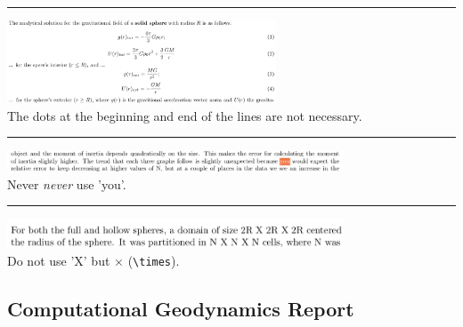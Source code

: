 \par\noindent\rule{\textwidth}{0.4pt}
\begin{center}
\includegraphics[width=8cm]{images/grading/dots}\\
The dots at the beginning and end of the lines are not necessary.
\end{center}

\par\noindent\rule{\textwidth}{0.4pt}
\begin{center}
\includegraphics[width=10cm]{images/grading/you}\\
Never {\it never} use 'you'. 
\end{center}

\par\noindent\rule{\textwidth}{0.4pt}
\begin{center}
\includegraphics[width=10cm]{images/grading/cross}\\
Do not use 'X' but $\times$ (\verb|\times|).
\end{center}




\subsection{Computational Geodynamics Report}

